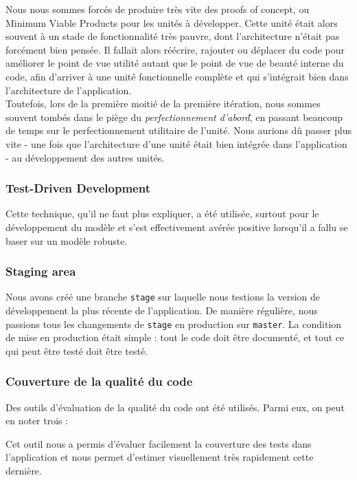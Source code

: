 	Nous nous sommes forcés de produire très vite des proofs of concept, ou 
	Minimum Viable Products pour les unités à développer. Cette unité était 
	alors souvent à un stade de fonctionnalité très pauvre, dont l'architecture 
	n'était pas forcément bien pensée. Il fallait alors réécrire, rajouter ou 
	déplacer du code pour améliorer le point de vue utilité autant que le point 
	de vue de beauté interne du code, afin d'arriver à une unité fonctionnelle 
	complète et qui s'intégrait bien dans l'architecture de l'application. \\

	Toutefois, lors de la première moitié de la première itération, nous sommes
	souvent tombés dans le piège du \"\textit{perfectionnement d'abord}\", en
	passant beaucoup de temps sur le perfectionnement utilitaire de l'unité.
	Nous aurions dû passer plus vite - une fois que l'architecture d'une unité
	était bien intégrée dans l'application - au développement des autres unités.

	\subsubsection{Test-Driven Development}
	Cette technique, qu'il ne faut plus expliquer, a été utilisée, surtout pour
	le développement du modèle et s'est effectivement avérée positive lorsqu'il
	a fallu se baser sur un modèle robuste.

	\subsubsection{Staging area}
	Nous avons créé une branche \texttt{stage} sur laquelle nous testions la 
	version de développement la plus récente de l'application. De manière
	régulière, nous passions tous les changements de \texttt{stage} en
	production sur \texttt{master}. La condition de mise en production était 
	simple : tout le code doit être documenté, et tout ce qui peut être testé
	doit être testé.

	\subsubsection{Couverture de la qualité du code}
	Des outils d'évaluation de la qualité du code ont été utilisés. Parmi eux, 
	on peut en noter trois : 

	Cet outil nous a permis d'évaluer facilement la couverture des tests dans 
	l'application et nous permet d'estimer visuellement très rapidement cette 
	dernière.

